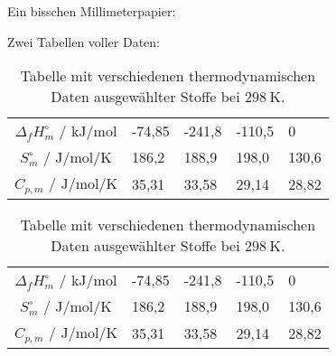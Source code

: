 \documentclass[./main.tex]{subfiles}
\begin{document}
Ein bisschen Millimeterpapier:\\


Zwei Tabellen voller Daten:
\begin{table}[H]
    \caption{Tabelle mit verschiedenen thermodynamischen Daten ausgew\"ahlter Stoffe bei $\SI{298}{\kelvin}$.}
    \label{tab: 2025-10-3_therm. Daten}
    \centering
    \begin{tabular}{|c|C{1.5cm}|C{1.5cm}|C{1.5cm}|C{1.5cm}|}
    \hline
        &  &  &  & \\\hline
        $\Delta_fH^{\circ}_m$ / $\si{\kilo\joule\per\mole}$ & -74,85 & -241,8 & -110,5 & 0\\\hline
        $S^{\circ}_m$ / $\si{\joule\per\mole\per\kelvin}$ & 186,2 & 188,9 & 198,0 & 130,6\\\hline
        $C_{p, m}$ / $\si{\joule\per\mole\per\kelvin}$ & 35,31 & 33,58 & 29,14 & 28,82\\\hline
    \end{tabular}
\end{table}

\begin{table}[H]
    \caption{Tabelle mit verschiedenen thermodynamischen Daten ausgew\"ahlter Stoffe bei $\SI{298}{\kelvin}$.}
    \label{tab: 2025-10-3_therm. Daten2}
    \centering
    \begin{tabular}{cC{1.5cm}C{1.5cm}C{1.5cm}C{1.5cm}}
    \toprule
        &  &  &  & \\\midrule
        $\Delta_fH^{\circ}_m$ / $\si{\kilo\joule\per\mole}$ & -74,85 & -241,8 & -110,5 & 0\\
        $S^{\circ}_m$ / $\si{\joule\per\mole\per\kelvin}$ & 186,2 & 188,9 & 198,0 & 130,6\\
        $C_{p, m}$ / $\si{\joule\per\mole\per\kelvin}$ & 35,31 & 33,58 & 29,14 & 28,82\\\bottomrule
    \end{tabular}
\end{table}

\aufgabenende
\end{document}
